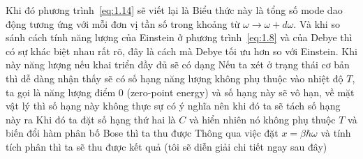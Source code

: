 Khi đó phương trình~\eqref{eq:1.14} sẽ viết lại là
Biểu thức này là tổng số mode dao động tương ứng với mỗi đơn vị tần số trong khoảng từ $\omega \rightarrow \omega + d\omega$. Và khi so sánh cách tính năng lượng của Einstein ở phương trình~\eqref{eq:1.8} và của Debye thì có sự khác biệt nhau rất rõ, đây là cách mà Debye tối ưu hơn so với Einstein. 
Khi này năng lượng nếu khai triển đầy đủ sẽ có dạng
Nếu ta xét ở trạng thái cơ bản thì dễ dàng nhận thấy sẽ có số hạng năng lượng không phụ thuộc vào nhiệt độ $T$, ta gọi là năng lượng điểm 0 (zero-point energy) và số hạng này sẽ vô hạn, về mặt vật lý thì số hạng này không thực sự có ý nghĩa nên khi đó ta sẽ tách số hạng này ra
Khi đó ta đặt số hạng thứ hai là $C$ và hiển nhiên nó không phụ thuộc $T$ và biến đổi hàm phân bố Bose thì ta thu được
Thông qua việc đặt $x=\beta\hbar\omega$ và tính tích phân thì ta sẽ thu được kết quả (tôi sẽ diễn giải chi tiết ngay sau đây)
